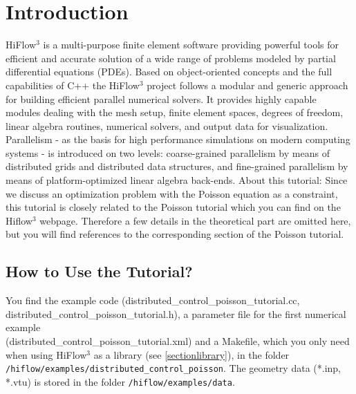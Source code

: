 \documentclass[a4paper, 11pt, twoside]{article}
\begin{document}
\thispagestyle{empty}




\newcommand{\dd}{\mathrm{d}}
\newtheorem{remark}{Remark}[section]
\thispagestyle{empty}
\tableofcontents

\newpage
\pagestyle{plain}
\vspace{0.5cm}
\section{Introduction}

HiFlow$^3$ is a multi-purpose finite element software providing powerful tools for efficient and accurate solution of a wide range of problems modeled by partial differential equations (PDEs). Based on object-oriented concepts and the full capabilities of C++ the HiFlow$^3$ project follows a modular and generic approach for building efficient parallel numerical solvers. It provides highly capable modules dealing with the mesh setup, finite element spaces, degrees of freedom, linear algebra routines, numerical solvers, and output data for visualization. Parallelism - as the basis for high performance simulations on modern computing systems - is introduced on two levels: coarse-grained parallelism by means of distributed grids and distributed data structures, and fine-grained parallelism by means of platform-optimized linear algebra back-ends.
About this tutorial: Since we discuss an optimization problem with the Poisson equation as a constraint, this tutorial is closely related to the Poisson tutorial which you can find on the Hiflow$^3$ webpage. Therefore a few details in the theoretical part are omitted here, but you will find references to the corresponding section of the Poisson tutorial.

\subsection{How to Use the Tutorial?}
You find the example code (distributed\_control\_poisson\_tutorial.cc, \\ 
distributed\_control\_poisson\_tutorial.h), a parameter file for the first numerical example\\ (distributed\_control\_poisson\_tutorial.xml)  
and a Makefile, which you only need when using HiFlow$^3$ as a library (see \ref{sectionlibrary}), in the folder \verb'/hiflow/examples/distributed_control_poisson'. The geometry data (*.inp, *.vtu) is stored in the folder \verb'/hiflow/examples/data'.
\end{document}
